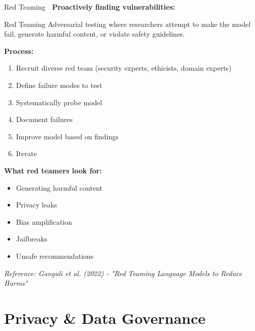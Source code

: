 \documentclass[aspectratio=169]{beamer}
\begin{document}
\begin{frame}[shrink=10]{Red Teaming 🔴}
\textbf{Proactively finding vulnerabilities:}

\vspace{0.5em}

\begin{block}{Red Teaming}
Adversarial testing where researchers attempt to make the model fail, generate harmful content, or violate safety guidelines.
\end{block}

\vspace{0.5em}

\textbf{Process:}
\begin{enumerate}\setlength{\itemsep}{0pt}
    \item Recruit diverse red team (security experts, ethicists, domain experts)
    \item Define failure modes to test
    \item Systematically probe model
    \item Document failures
    \item Improve model based on findings
    \item Iterate
\end{enumerate}

\vspace{0.5em}

\textbf{What red teamers look for:}
\begin{itemize}\setlength{\itemsep}{0pt}
    \item Generating harmful content
    \item Privacy leaks
    \item Bias amplification
    \item Jailbreaks
    \item Unsafe recommendations
\end{itemize}

\vspace{0.3em}

\small
\textit{Reference: Ganguli et al. (2022) - "Red Teaming Language Models to Reduce Harms"}
\end{frame}

\section{Privacy \& Data Governance}
\end{document}
